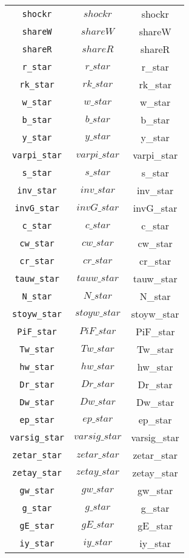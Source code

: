 \begin{center}
\begin{longtable}{ccc}
\texttt{shockr} & $shockr$ & shockr\\
\texttt{shareW} & $shareW$ & shareW\\
\texttt{shareR} & $shareR$ & shareR\\
\texttt{r\_star} & $r\_star$ & r\_star\\
\texttt{rk\_star} & $rk\_star$ & rk\_star\\
\texttt{w\_star} & $w\_star$ & w\_star\\
\texttt{b\_star} & $b\_star$ & b\_star\\
\texttt{y\_star} & $y\_star$ & y\_star\\
\texttt{varpi\_star} & $varpi\_star$ & varpi\_star\\
\texttt{s\_star} & $s\_star$ & s\_star\\
\texttt{inv\_star} & $inv\_star$ & inv\_star\\
\texttt{invG\_star} & $invG\_star$ & invG\_star\\
\texttt{c\_star} & $c\_star$ & c\_star\\
\texttt{cw\_star} & $cw\_star$ & cw\_star\\
\texttt{cr\_star} & $cr\_star$ & cr\_star\\
\texttt{tauw\_star} & $tauw\_star$ & tauw\_star\\
\texttt{N\_star} & $N\_star$ & N\_star\\
\texttt{stoyw\_star} & $stoyw\_star$ & stoyw\_star\\
\texttt{PiF\_star} & $PiF\_star$ & PiF\_star\\
\texttt{Tw\_star} & $Tw\_star$ & Tw\_star\\
\texttt{hw\_star} & $hw\_star$ & hw\_star\\
\texttt{Dr\_star} & $Dr\_star$ & Dr\_star\\
\texttt{Dw\_star} & $Dw\_star$ & Dw\_star\\
\texttt{ep\_star} & $ep\_star$ & ep\_star\\
\texttt{varsig\_star} & $varsig\_star$ & varsig\_star\\
\texttt{zetar\_star} & $zetar\_star$ & zetar\_star\\
\texttt{zetay\_star} & $zetay\_star$ & zetay\_star\\
\texttt{gw\_star} & $gw\_star$ & gw\_star\\
\texttt{g\_star} & $g\_star$ & g\_star\\
\texttt{gE\_star} & $gE\_star$ & gE\_star\\
\texttt{iy\_star} & $iy\_star$ & iy\_star\\

\end{longtable}
\end{center}
